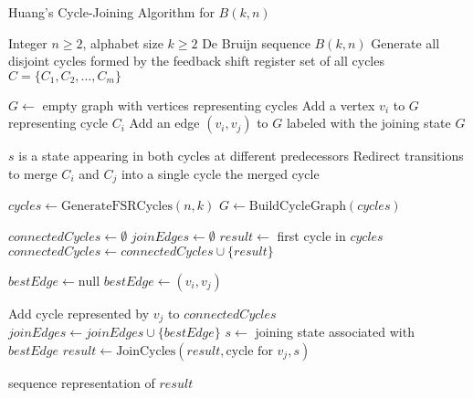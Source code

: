 \documentclass{article}
\theoremstyle{definition}
\begin{document}
\begin{algorithm}
\caption{Huang's Cycle-Joining Algorithm for $B(k, n)$}
\begin{algorithmic}[1]
\Require Integer $n \geq 2$, alphabet size $k \geq 2$
\Ensure De Bruijn sequence $B(k, n)$
    \State Generate all disjoint cycles formed by the feedback shift register
    \State \Return set of all cycles $C = \{C_1, C_2, \ldots, C_m\}$
\EndFunction

    \State $G \gets$ empty graph with vertices representing cycles
        \State Add a vertex $v_i$ to $G$ representing cycle $C_i$
    \EndFor
        \State Add an edge $(v_i, v_j)$ to $G$ labeled with the joining state
    \EndFor
    \State \Return $G$
\EndFunction

    \State $s$ is a state appearing in both cycles at different predecessors
    \State Redirect transitions to merge $C_i$ and $C_j$ into a single cycle
    \State \Return the merged cycle
\EndFunction

\State $cycles \gets \text{GenerateFSRCycles}(n, k)$
\State $G \gets \text{BuildCycleGraph}(cycles)$

\State $connectedCycles \gets \emptyset$ 
\State $joinEdges \gets \emptyset$ 
\State $result \gets$ first cycle in $cycles$
\State $connectedCycles \gets connectedCycles \cup \{result\}$

    \State $bestEdge \gets \text{null}$
            \State $bestEdge \gets (v_i, v_j)$
        \EndIf
    \EndFor
    
    \State Add cycle represented by $v_j$ to $connectedCycles$
    \State $joinEdges \gets joinEdges \cup \{bestEdge\}$
    \State $s \gets$ joining state associated with $bestEdge$
    \State $result \gets \text{JoinCycles}(result, \text{cycle for } v_j, s)$
\EndWhile

\State \Return sequence representation of $result$
\end{algorithmic}
\end{algorithm}
\end{document}

